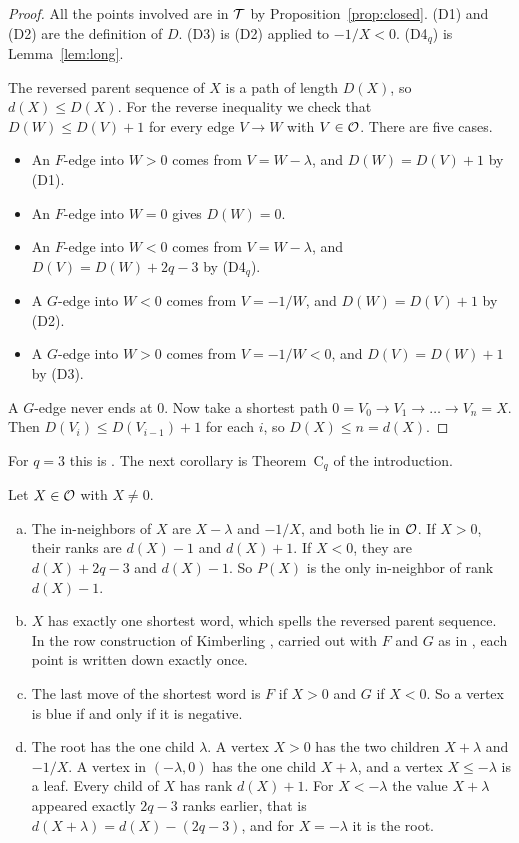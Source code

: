 \begin{proof}
All the points involved are in $\mathcal{T}$ by Proposition~\ref{prop:closed}. (D1) and (D2) are the
definition of $D$. (D3) is (D2) applied to $-1/X<0$. (D4$_q$) is Lemma~\ref{lem:long}.

The reversed parent sequence of $X$ is a path of length $D(X)$, so $d(X)\le D(X)$. For the reverse
inequality we check that $D(W)\le D(V)+1$ for every edge $V\to W$ with $V\in\mathcal{O}$. There are five
cases.
\begin{itemize}[itemsep=0pt,topsep=2pt]
\item An $F$-edge into $W>0$ comes from $V=W-\lambda$, and $D(W)=D(V)+1$ by (D1).
\item An $F$-edge into $W=0$ gives $D(W)=0$.
\item An $F$-edge into $W<0$ comes from $V=W-\lambda$, and $D(V)=D(W)+2q-3$ by (D4$_q$).
\item A $G$-edge into $W<0$ comes from $V=-1/W$, and $D(W)=D(V)+1$ by (D2).
\item A $G$-edge into $W>0$ comes from $V=-1/W<0$, and $D(V)=D(W)+1$ by (D3).
\end{itemize}
A $G$-edge never ends at $0$. Now take a shortest path $0=V_0\to V_1\to\dots\to V_n=X$. Then
$D(V_i)\le D(V_{i-1})+1$ for each $i$, so $D(X)\le n=d(X)$.
\end{proof}

For $q=3$ this is \cite[Theorem~3.6]{P137}. The next corollary is Theorem~C$_q$ of the introduction.

\begin{corollary}\label{cor:Cq}
Let $X\in\mathcal{O}$ with $X\neq0$.
\begin{enumerate}[(a)]
\item The in-neighbors of $X$ are $X-\lambda$ and $-1/X$, and both lie in $\mathcal{O}$. If $X>0$, their ranks
are $d(X)-1$ and $d(X)+1$. If $X<0$, they are $d(X)+2q-3$ and $d(X)-1$. So $P(X)$ is the only
in-neighbor of rank $d(X)-1$.
\item $X$ has exactly one shortest word, which spells the reversed parent sequence. In the row
construction of Kimberling \cite{oeisA226247}, carried out with $F$ and $G$ as in
\cite[Section~2]{P137}, each point is written down exactly once.
\item The last move of the shortest word is $F$ if $X>0$ and $G$ if $X<0$. So a vertex is blue if and
only if it is negative.
\item The root has the one child $\lambda$. A vertex $X>0$ has the two children $X+\lambda$ and $-1/X$.
A vertex in $(-\lambda,0)$ has the one child $X+\lambda$, and a vertex $X\le-\lambda$ is a leaf. Every
child of $X$ has rank $d(X)+1$. For $X<-\lambda$ the value $X+\lambda$ appeared exactly $2q-3$ ranks
earlier, that is $d(X+\lambda)=d(X)-(2q-3)$, and for $X=-\lambda$ it is the root.
\end{enumerate}
\end{corollary}

